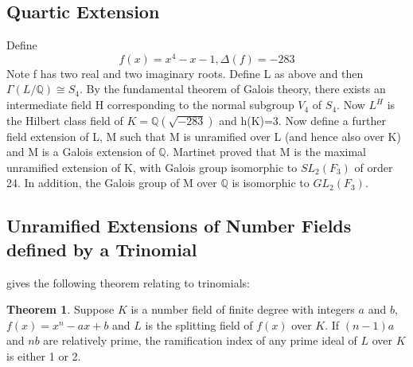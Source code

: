 \documentclass[12pt]{extarticle}
\newcommand{\<}{\langle}
\renewcommand{\>}{\rangle}
\theoremstyle{definition}
\newtheorem{theorem}{Theorem}
\begin{document}
\subsection{Quartic Extension}
Define  \begin{equation}
    f(x)=x^4-x-1, \Delta(f)=-283
\end{equation}
Note f has two real and two imaginary roots. Define L as above and then $\Gamma(L/\mathbb{Q})\cong S_4$. By the fundamental theorem of Galois theory, there exists an intermediate field H corresponding to the normal subgroup $V_4$ of $S_4$. Now $L^H$ is the Hilbert class field of $K= \mathbb{Q}(\sqrt{-283})$ and h(K)=3. Now define a further field extension of L, M such that M is unramified over L (and hence also over K) and M is a Galois extension of $\mathbb{Q}$. Martinet proved that M is the maximal unramified extension of K, with Galois group isomorphic to $SL_2(F_3)$ of order 24. In addition, the Galois group of M over $\mathbb{Q}$ is isomorphic to $GL_2(F_3)$. 
\begin{center}
\end{center}
\subsection{Unramified Extensions of Number Fields defined by a Trinomial}
\cite{uchida1970} gives the following theorem relating to trinomials:
\begin{theorem}
Suppose $K$ is a number field of finite degree with integers $a$ and $b$, $f(x) = x^n-ax+b$ and $L$ is the splitting field of $f(x)$ over $K$. If $(n-1)a$ and $nb$ are relatively prime, the ramification index of any prime ideal of $L$ over $K$ is either 1 or 2. 
\end{theorem}
\end{document}
